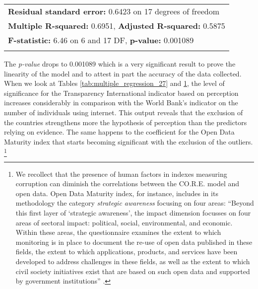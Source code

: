 \documentclass[a4paper, twoside]{report}
\let\oldfootnote\footnote
\renewcommand\footnote[1]{%
\oldfootnote{\hspace{2mm}#1}}
\begin{document}
\begin{landscape}
\begin{table}[htbp]
\begin{adjustbox}{max width=\linewidth}
\begin{tabular}{lllllllllll}
    \multicolumn{11}{l}{\textbf{Residual standard error:} 0.6423 on 17 degrees of freedom} \\
    \multicolumn{11}{l}{\textbf{Multiple R-squared:}  0.6951, \textbf{Adjusted R-squared:}  0.5875 } \\
    \multicolumn{11}{l}{\textbf{F-statistic:} 6.46 on 6 and 17 DF,  \textbf{p-value:} 0.001089} \\
    \multicolumn{11}{l}{} \\
    \bottomrule
    \end{tabular}%


    \end{adjustbox}
  \label{tab:multiple_regression_24}%
\end{table}%
\end{landscape}

The \textit{p-value} drops to 0.001089 which is a very significant result to prove the linearity of the model and to attest in part the accuracy of the data collected. When we look at Tables \ref{tab:multiple_regression_27} and \ref{tab:multiple_regression_24}, the level of significance for the Transparency International indicator based on perception increases considerably in comparison with the World Bank's indicator on the number of individuals using internet. This output reveals that the exclusion of the countries strengthens more the hypothesis of perception than the predictors relying on evidence. The same happens to the coefficient for the Open Data Maturity index that starts becoming significant with the exclusion of the outliers.\footnote{We recollect that the presence of human factors in indexes measuring corruption can diminish the correlations between the CO.R.E. model and open data. Open Data Maturity index, for instance, includes in its methodology the category \textit{strategic awareness} focusing on four areas: ``Beyond this first layer of `strategic awareness', the impact dimension focusses on four areas of sectoral impact: political, social, environmental, and economic. Within these areas, the questionnaire examines the extent to which monitoring is in place to document the re-use of open data published in these fields, the extent to which applications, products, and services have been developed to address challenges in these fields, as well as the extent to which civil society initiatives exist that are based on such open data and supported by government institutions'' \citep[p. 9]{open_data_maturity}\label{ftn:odm_footnote}.}\\
\end{document}
